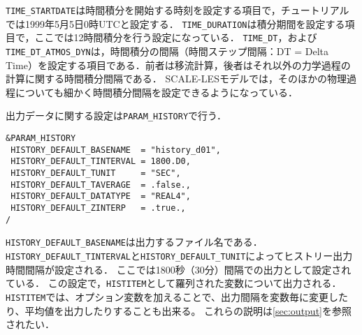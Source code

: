 \verb|TIME_STARTDATE|は時間積分を開始する時刻を設定する項目で，チュートリアルでは1999年5月5日0時UTCと設定する．
\verb|TIME_DURATION|は積分期間を設定する項目で，ここでは12時間積分を行う設定になっている．
\verb|TIME_DT|，および\verb|TIME_DT_ATMOS_DYN|は，時間積分の間隔（時間ステップ間隔：DT = Delta Time）を設定する項目である．前者は移流計算，後者はそれ以外の力学過程の計算に関する時間積分間隔である．
SCALE-LESモデルでは，そのほかの物理過程についても細かく時間積分間隔を設定できるようになっている．


出力データに関する設定は\verb|PARAM_HISTORY|で行う．

\begin{verbatim}
&PARAM_HISTORY
 HISTORY_DEFAULT_BASENAME  = "history_d01",
 HISTORY_DEFAULT_TINTERVAL = 1800.D0,
 HISTORY_DEFAULT_TUNIT     = "SEC",
 HISTORY_DEFAULT_TAVERAGE  = .false.,
 HISTORY_DEFAULT_DATATYPE  = "REAL4",
 HISTORY_DEFAULT_ZINTERP   = .true.,
/
\end{verbatim}

\verb|HISTORY_DEFAULT_BASENAME|は出力するファイル名である．
\verb|HISTORY_DEFAULT_TINTERVAL|と\verb|HISTORY_DEFAULT_TUNIT|によってヒストリー出力時間間隔が設定される．
ここでは1800秒（30分）間隔での出力として設定されている．
この設定で，\verb|HISTITEM|として羅列された変数について出力される．
\verb|HISTITEM|では、オプション変数を加えることで、出力間隔を変数毎に変更したり、平均値を出力したりすることも出来る。
これらの説明は\ref{sec:output}を参照されたい．

